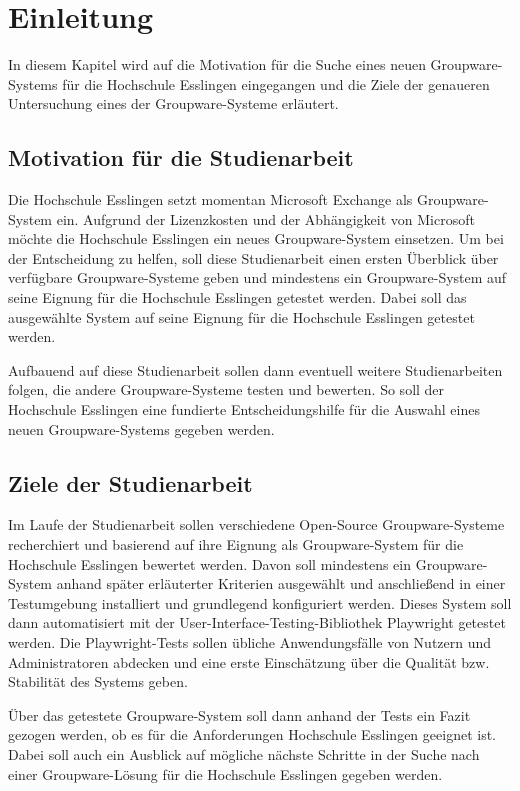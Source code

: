 
\chapter{Einleitung}

In diesem Kapitel wird auf die Motivation für die Suche eines neuen Groupware-Systems für die Hochschule Esslingen eingegangen und die Ziele der genaueren Untersuchung eines der Groupware-Systeme erläutert.


\section{Motivation für die Studienarbeit}

Die Hochschule Esslingen setzt momentan Microsoft Exchange als Groupware-System ein.
Aufgrund der Lizenzkosten und der Abhängigkeit von Microsoft möchte die Hochschule Esslingen ein neues Groupware-System einsetzen.
Um bei der Entscheidung zu helfen, soll diese Studienarbeit einen ersten Überblick über verfügbare Groupware-Systeme geben und mindestens ein Groupware-System auf seine Eignung für die Hochschule Esslingen getestet werden.
Dabei soll das ausgewählte System auf seine Eignung für die Hochschule Esslingen getestet werden.

Aufbauend auf diese Studienarbeit sollen dann eventuell weitere Studienarbeiten folgen, die andere Groupware-Systeme testen und bewerten.
So soll der Hochschule Esslingen eine fundierte Entscheidungshilfe für die Auswahl eines neuen Groupware-Systems gegeben werden.


\section{Ziele der Studienarbeit}

Im Laufe der Studienarbeit sollen verschiedene Open-Source Groupware-Systeme recherchiert und basierend auf ihre Eignung als Groupware-System für die Hochschule Esslingen bewertet werden.
Davon soll mindestens ein Groupware-System anhand später erläuterter Kriterien ausgewählt und anschließend in einer Testumgebung installiert und grundlegend konfiguriert werden.
Dieses System soll dann automatisiert mit der User-Interface-Testing-Bibliothek Playwright getestet werden.
Die Playwright-Tests sollen übliche Anwendungsfälle von Nutzern und Administratoren abdecken und eine erste Einschätzung über die Qualität bzw. Stabilität des Systems geben.

Über das getestete Groupware-System soll dann anhand der Tests ein Fazit gezogen werden, ob es für die Anforderungen Hochschule Esslingen geeignet ist.
Dabei soll auch ein Ausblick auf mögliche nächste Schritte in der Suche nach einer Groupware-Lösung für die Hochschule Esslingen gegeben werden.



